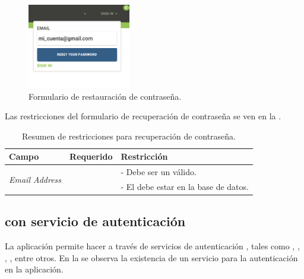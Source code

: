 \begin{figure}[H]
	\centering
	\includegraphics[width=0.4\textwidth]{figuras/architecture/accounts/reset/form.png}
	\caption{Formulario de restauración de contraseña.}
	\label{figure:account:reset:form}
\end{figure}

Las restricciones del formulario de recuperación de contraseña se ven en la .

\begin{table}[H]
    \centering
	\begin{tabular}{ |l|c||l| }
		\hline Campo & Requerido & Restricción \\ \hline
		\multirow{2}{*}{\textit{Email Address}} &  \multirow{2}{*}{\checkmark}
				& - Debe ser un \email válido. \\ 
			& 	& - El \email debe estar en la base de datos. \\ \hline
	\end{tabular}
 	\caption{Resumen de restricciones para recuperación de contraseña.}
    \label{tab:architecture:accounts:recovery:form}
\end{table}

\subsection{\loginUpperCPT  con servicio de autenticación \thirdParty}

La aplicación permite hacer \loginCPT a través de servicios de autenticación \thirdParty, tales como \facebook, \googleNAME, \twitterNAME, \gitHubNAME, entre otros. En la  se observa la existencia de un servicio \thirdParty para la autenticación en la aplicación.



